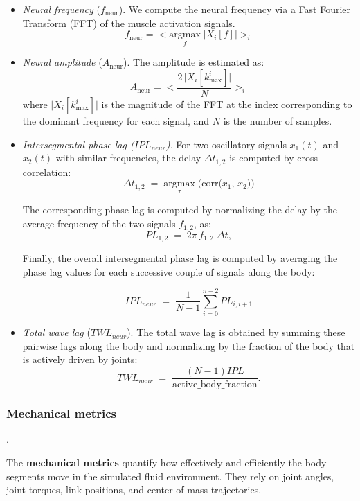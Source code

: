 \documentclass{cmc}
\begin{document}
\begin{itemize}
  \item \textit{Neural frequency} (\(f_{\mathrm{neur}}\)).
  We compute the neural frequency via a Fast Fourier Transform (FFT) of the muscle activation signals.
  \[
    f_{\mathrm{neur}} = < \underset{f}{\mathrm{argmax}}\;\bigl|X_i[f]\bigr| >_i
  \]


  \item \textit{Neural amplitude} (\(A_{\mathrm{neur}}\)).
  The amplitude is estimated as:
  \[
    A_{\mathrm{neur}} = <\frac{2\,\bigl|X_i[k^i_{\text{max}}]\bigr|}{N} >_i
  \]
  where \(\bigl|X_i[k^i_{\text{max}}]\bigr|\) is the magnitude of the FFT at the index corresponding to the dominant frequency for each signal, and \(N\) is the number of samples.


  \item \textit{Intersegmental phase lag ($IPL_{neur}$).}
  For two oscillatory signals \(x_1(t)\) and \(x_2(t)\) with similar frequencies,
  the delay \(\Delta t_{1,2}\) is computed by cross-correlation:
  \[
    \Delta t_{1,2}\;=\;\underset{\tau}{\mathrm{argmax}}\;\bigl(\mathrm{corr}\bigl(x_1,\,x_2\bigr)\bigr)
  \]

  The corresponding phase lag is computed by normalizing the delay by the average frequency of the two signals \(f_{1,2}\), as:
  \[
    PL_{1,2} \;=\; 2\pi\,f_{1,2}\;\Delta t,
  \]

  Finally, the overall intersegmental phase lag is computed by averaging the phase lag values for each successive couple of signals along the body:

    \[
    IPL_{neur} \;=\; \frac{1}{N-1} \sum_{i=0}^{n-2} PL_{i, i+1}
  \]

  \item \textit{Total wave lag} ($TWL_{neur}$).
  The total wave lag is obtained by summing these pairwise lags along the body and normalizing by the fraction of the body that is actively driven by joints:
  \[
    TWL_{neur} \;=\;\frac{(N-1) IPL}{\text{active\_body\_fraction}}.
  \]


\end{itemize}

\subsubsection*{Mechanical metrics}.

The \textbf{mechanical metrics} quantify how effectively and efficiently the body segments move in the simulated fluid environment. They rely on joint angles, joint torques, link positions, and center-of-mass trajectories.
\end{document}
